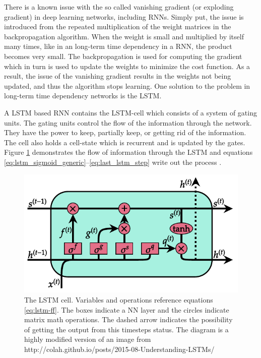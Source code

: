 \documentclass[../main.tex]{subfiles}
\begin{document}
There is a known issue with the so called vanishing gradient (or exploding gradient) in deep learning networks, including \acp{RNN}.
Simply put, the issue is introduced from the repeated multiplication of the weight matrices in the backpropagation algorithm.
When the weight is small and multiplied by itself many times, like in an long-term time dependency in a \ac{RNN}, the product becomes very small.
The backpropagation is used for computing the gradient which in turn is used to update the weights to minimize the cost function.
As a result, the issue of the vanishing gradient results in the weights not being updated, and thus the algorithm stops learning.
One solution to the problem in long-term time dependency networks is the \ac{LSTM}.

A \ac{LSTM} based \ac{RNN} contains the \ac{LSTM}-cell which consists of a system of gating units.
The gating units control the flow of the information through the network.
They have the power to keep, partially keep, or getting rid of the information.
The cell also holds a cell-state which is recurrent and is updated by the gates.
Figure \ref{fig:lstm-cell} demonstrates the flow of information through the \ac{LSTM} and equations \ref{eq:lstm_sigmoid_generic}--\ref{eq:last_lstm_step} write out the process \cite{Goodfellow2016}.
\begin{figure}[ht!]
    \centering
    \includegraphics{img/LSTM-cell.pdf}
    \caption{The \ac{LSTM} cell. Variables and operations reference equations \ref{eq:lstm-ff}. The boxes indicate a \ac{NN} layer and the circles indicate matrix math operations. The dashed arrow indicates the possibility of getting the output from this timesteps status. The diagram is a highly modified version of an image from http://colah.github.io/posts/2015-08-Understanding-LSTMs/}
    \label{fig:lstm-cell}
\end{figure}
\end{document}
